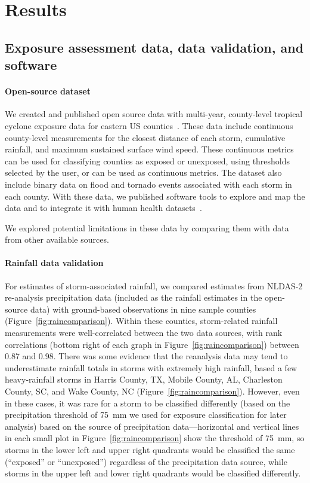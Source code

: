 \section*{Results}

\subsection*{Exposure assessment data, data validation, and software}

\paragraph{Open-source dataset}

We created and published open source data with multi-year, county-level
tropical cyclone exposure data for eastern \ac{US}
counties~\parencite{hurricaneexposuredata}. These data include continuous
county-level measurements for the closest distance of each storm, cumulative
rainfall, and maximum sustained surface wind speed. These continuous metrics
can be used for classifying counties as exposed or unexposed, using thresholds
selected by the user, or can be used as continuous metrics. The dataset also
include binary data on flood and tornado events associated with each storm in
each county. With these data, we published software tools to explore and map
the data and to integrate it with human health
datasets~\parencite{hurricaneexposure}. 

We explored potential limitations in these data by comparing them with data
from other available sources. 

\paragraph{Rainfall data validation}

For estimates of storm-associated rainfall, we compared estimates from NLDAS-2
re-analysis precipitation data (included as the rainfall estimates in the
open-source data) with ground-based observations in nine sample counties
(Figure~\ref{fig:raincomparison}). Within these counties, storm-related
rainfall measurements were well-correlated between the two data sources, with
rank correlations (bottom right of each graph in
Figure~\ref{fig:raincomparison}) between 0.87 and 0.98. There was some evidence
that the reanalysis data may tend to underestimate rainfall totals in storms
with extremely high rainfall, based a few heavy-rainfall storms in Harris
County, TX, Mobile County, AL, Charleston County, SC, and Wake County, NC
(Figure~\ref{fig:raincomparison}). However, even in these cases, it was rare
for a storm to be classified differently (based on the precipitation threshold
of 75~\si{\milli\metre} we used for exposure classification for later analysis)
based on the source of precipitation data---horizontal and vertical lines in
each small plot in Figure~\ref{fig:raincomparison} show the threshold of
75~\si{\milli\metre}, so storms in the lower left and upper right quadrants
would be classified the same (``exposed'' or ``unexposed'') regardless of the
precipitation data source, while storms in the upper left and lower right
quadrants would be classified differently.

